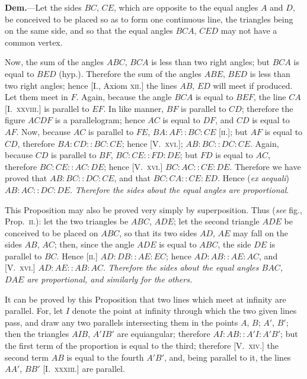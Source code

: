 \documentclass[oneside]{book}
\begin{document}
\textbf{Dem.}---Let the sides $BC$, $CE$, which are opposite to
the equal angles $A$ and $D$, be conceived to be placed so
as to form one continuous line,
the triangles being on the same
side, and so that the equal
angles $BCA$, $CED$ may not
have a common vertex.

Now, the sum of the angles
$ABC$, $BCA$ is less than two
right angles; but $BCA$ is equal
to $BED$ (hyp.). Therefore the sum of the angles $ABE$,
$BED$ is less than two right angles; hence [I., Axiom
\textsc{xii.}] the lines $AB$, $ED$ will meet if produced. Let them
meet in $F$. Again, because the angle $BCA$ is equal
to $BEF$, the line $CA$ [I.\ \textsc{xxviii.}] is parallel to $EF$. In
like manner, $BF$ is parallel to $CD$; therefore the figure
$ACDF$ is a parallelogram; hence $AC$ is equal to $DF$,
and $CD$ is equal to $AF$. Now, because $AC$ is parallel
to $FE$, $BA:AF :: BC:CE$ \textsc{[ii.]}; but $AF$ is equal to
$CD$, therefore $BA:CD :: BC:CE$; hence [V.~\textsc{xvi.}];
$AB:BC :: DC:CE$. Again, because $CD$ is parallel
to $BF$, $BC:CE :: FD:DE$; but $FD$ is equal to
$AC$, therefore $BC:CE :: AC:DE$; hence [V.~\textsc{xvi.}]
$BC:AC :: CE:DE$. Therefore we have proved that
$AB:BC :: DC:CE$, and that $BC:CA :: CE:ED$.
Hence (\emph{ex aequali}) $AB:AC :: DC:DE$. \emph{Therefore
the sides about the equal angles are proportional}.

\smallskip
\begin{footnotesize}
This Proposition may also be proved very simply by superposition.
Thus (\emph{see} fig., Prop.~\textsc{ii.}): let the two triangles be $ABC$,
$ADE$; let the second triangle $ADE$ be conceived to be placed on
$ABC$, so that its two sides $AD$, $AE$ may fall on the sides $AB$,
$AC$; then, since the angle $ADE$ is equal to $ABC$, the side $DE$
is parallel to $BC$. Hence \textsc{[ii.]} $AD:DB :: AE:EC$; hence
$AD:AB :: AE:AC$, and [V.~\textsc{xvi.}] $AD:AE :: AB:AC$.
\textit{Therefore the sides about the equal angles $BAC$, $DAE$ are
proportional, and similarly for the others.}

It can be proved by this Proposition that two lines which meet
at infinity are parallel. For, let $I$ denote the point at infinity
through which the two given lines pass, and draw any two parallels
intersecting them in the points $A$, $B$; $A'$, $B'$; then the
triangles $AIB$, $A'IB'$ are equiangular; therefore $AI:AB :: A'I:A'B'$;
but the first term of the proportion is equal to the third;
therefore [V.~\textsc{xiv.}] the second term $AB$ is equal to the fourth
$A'B'$, and, being parallel to it, the lines $AA'$, $BB'$ [I.~\textsc{xxxiii.}]
are parallel.
\par\end{footnotesize}
\end{document}

